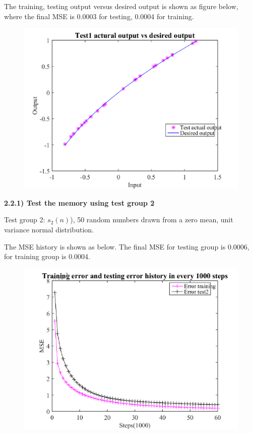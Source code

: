 \documentclass[epsfig]{article}
\def\bpar{\vskip26pt}
\def\npar{\vskip13pt}
\begin{document}
The training, testing output versus desired output is shown as figure below, where the final MSE is 0.0003 for testing, 0.0004 for training.

\begin{figure}[H] 
\centering\includegraphics[width=4.5in]{output_test1.png} 
\end{figure} 




{\bf 
\npar
2.2.1) Test the memory using test group 2

\bpar
}


Test group 2: $s_2{(n)}$), 50 random numbers drawn from a zero mean, unit variance normal distribution.


The MSE history is shown as below.  The final MSE for testing group is 0.0006, for training group is 0.0004.

\begin{figure}[H] 
\centering\includegraphics[width=4.5in]{err_test2.png} 
\end{figure} 
\end{document}
